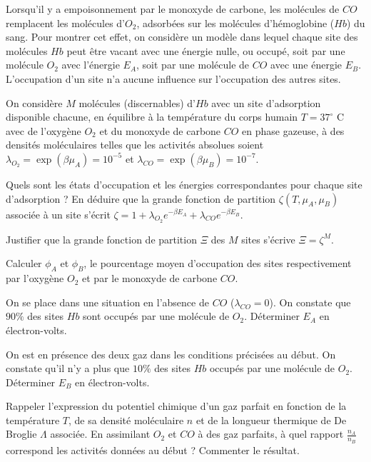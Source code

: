 Lorsqu'il y a empoisonnement par le monoxyde de carbone, les molécules de $CO$ remplacent les molécules d'$O_2$, adsorbées sur les molécules d'hémoglobine ($Hb$) du sang. Pour montrer cet effet, on considère un modèle dans lequel chaque site des molécules $Hb$ peut être vacant avec une énergie nulle, ou occupé, soit par une molécule $O_2$ avec l'énergie $E_A$, soit par une molécule de $CO$ avec une énergie $E_B$. L'occupation d'un site n'a aucune influence sur l'occupation des autres sites.

On considère $M$ molécules (discernables) d'$Hb$ avec un site d'adsorption disponible chacune, en équilibre à la température du corps humain $T=37^{\circ} $ C avec de l'oxygène $O_2$ et du monoxyde de carbone $CO$ en phase gazeuse, à des densités moléculaires telles que les activités absolues soient $\lambda_{O_2}=\exp(\beta \mu_{A})=10^{-5}$ et $\lambda_{CO}=\exp(\beta \mu_{B})=10^{-7}$.

\medskip


\question Quels sont les états d'occupation et les énergies correspondantes pour chaque site d'adsorption ? En déduire que la grande fonction de partition $\zeta(T, \mu_A,\mu_B)$ associée à un site s'écrit $\zeta=1+\lambda_{O_2} e^{-\beta E_A} +\lambda_{CO} e^{-\beta E_B}$.

\question Justifier que la grande fonction de partition $\Xi$ des $M$ sites s'écrive $\Xi=\zeta^M$.

\question Calculer $\phi_A$ et $\phi_B$, le pourcentage moyen d'occupation  des sites respectivement par l'oxygène $O_2$ et par le monoxyde de carbone $CO$.

\question On se place dans une situation en l'absence de $CO$ ($\lambda_{CO}=0$). On constate que $90\%$ des sites $Hb$ sont occupés par une molécule de $O_2$. Déterminer $E_A$ en électron-volts.

\question On est en présence des deux gaz dans les conditions précisées au début. On constate qu'il n'y a plus que $10\%$ des sites $Hb$ occupés par une molécule de $O_2$. Déterminer $E_B$ en électron-volts.

\question Rappeler l'expression du potentiel chimique d'un gaz parfait en fonction de la température $T$, de sa densité moléculaire $n$ et de la longueur thermique de De Broglie $\Lambda$ associée. En assimilant $O_2$ et $CO$ à des gaz parfaits, à quel rapport $\frac{n_A}{n_B}$ correspond les activités données au début ? Commenter le résultat.
